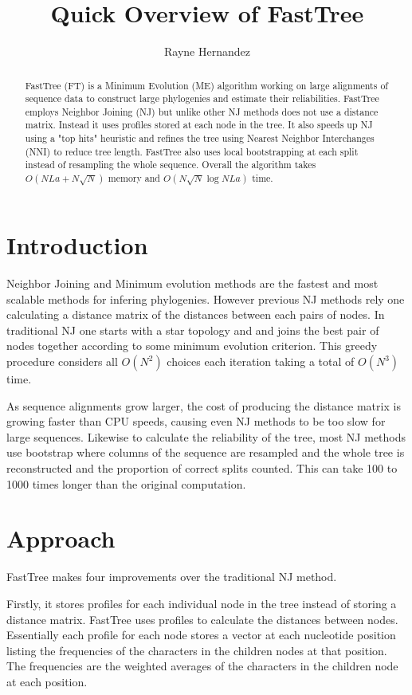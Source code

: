 \documentclass[a4paper]{article}
\title{Quick Overview of FastTree}
\author{Rayne Hernandez}
\begin{document}
\maketitle

\begin{abstract}
FastTree (FT) is a Minimum Evolution (ME) algorithm working on large alignments of sequence data to construct large phylogenies and estimate their reliabilities. FastTree employs Neighbor Joining (NJ) but unlike other NJ methods does not use a distance matrix. Instead it uses profiles stored at each node in the tree. It also speeds up NJ using a "top hits" heuristic and refines the tree using Nearest Neighbor Interchanges (NNI) to reduce tree length. FastTree also uses local bootstrapping at each split instead of resampling the whole sequence. Overall the algorithm takes \(O(NLa + N\sqrt{N})\) memory and \(O(N\sqrt{N}\log{N}La)\) time. 
\end{abstract}

\section{Introduction}

Neighbor Joining and Minimum evolution methods are the fastest and most scalable methods for infering phylogenies. However previous NJ methods rely one calculating a distance matrix of the distances between each pairs of nodes. In traditional NJ one starts with a star topology and and joins the best pair of nodes together according to some minimum evolution criterion. This greedy procedure considers all \(O(N^2)\) choices each iteration taking a total of \(O(N^3)\) time. 

As sequence alignments grow larger, the cost of producing the distance matrix is growing faster than CPU speeds, causing even NJ methods to be too slow for large sequences. Likewise to calculate the reliability of the tree, most NJ methods use bootstrap where columns of the sequence are resampled and the whole tree is reconstructed and the proportion of correct splits counted. This can take 100 to 1000 times longer than the original computation. 

\section{Approach} 

FastTree makes four improvements over the traditional NJ method. 

Firstly, it stores profiles for each individual node in the tree instead of storing a distance matrix. FastTree uses profiles to calculate the distances between nodes. Essentially each profile for each node stores a vector at each nucleotide position listing the frequencies of the characters in the children nodes at that position. The frequencies are the weighted averages of the characters in the children node at each position. 
\end{document}
